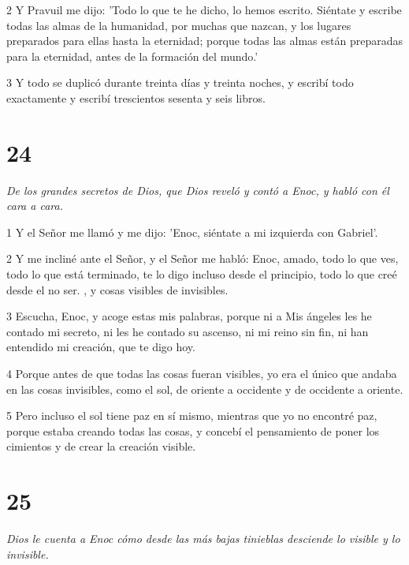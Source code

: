\par 2 Y Pravuil me dijo: 'Todo lo que te he dicho, lo hemos escrito. Siéntate y escribe todas las almas de la humanidad, por muchas que nazcan, y los lugares preparados para ellas hasta la eternidad; porque todas las almas están preparadas para la eternidad, antes de la formación del mundo.'

\par 3 Y todo se duplicó durante treinta días y treinta noches, y escribí todo exactamente y escribí trescientos sesenta y seis libros.

\chapter{24}

\par \textit{De los grandes secretos de Dios, que Dios reveló y contó a Enoc, y habló con él cara a cara.}

\par 1 Y el Señor me llamó y me dijo: 'Enoc, siéntate a mi izquierda con Gabriel'.

\par 2 Y me incliné ante el Señor, y el Señor me habló: Enoc, amado, todo lo que ves, todo lo que está terminado, te lo digo incluso desde el principio, todo lo que creé desde el no ser. , y cosas visibles de invisibles.

\par 3 Escucha, Enoc, y acoge estas mis palabras, porque ni a Mis ángeles les he contado mi secreto, ni les he contado su ascenso, ni mi reino sin fin, ni han entendido mi creación, que te digo hoy.

\par 4 Porque antes de que todas las cosas fueran visibles, yo era el único que andaba en las cosas invisibles, como el sol, de oriente a occidente y de occidente a oriente.

\par 5 Pero incluso el sol tiene paz en sí mismo, mientras que yo no encontré paz, porque estaba creando todas las cosas, y concebí el pensamiento de poner los cimientos y de crear la creación visible.

\chapter{25}

\par \textit{Dios le cuenta a Enoc cómo desde las más bajas tinieblas desciende lo visible y lo invisible.}

